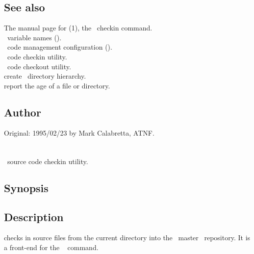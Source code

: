 \subsection*{See also}

The manual page for (1), the \rcs\ checkin command.\\
\aipspp\ variable names ().\\
\aipspp\ code management configuration ().\\
 \aipspp\ code checkin utility.\\
 \aipspp\ code checkout utility.\\
 create \aipspp\ directory hierarchy.\\
 report the age of a file or directory.

\subsection*{Author}

Original: 1995/02/23 by Mark Calabretta, ATNF.


\newpage
\section{}
\label{ai}

\aipspp\ source code checkin utility.

\subsection*{Synopsis}

\begin{synopsis}
\end{synopsis}

\subsection*{Description}

 checks in source files from the current directory into the \aipspp\ 
master \rcs\ repository.  It is a front-end for the \rcs\ 
command.

